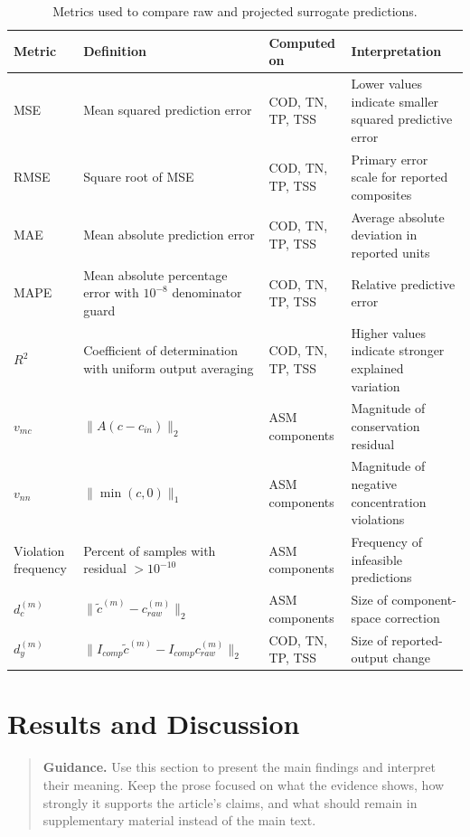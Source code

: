\documentclass[a4paper,fleqn]{cas-sc}
\newcommand{\draftguidance}[1]{%
\begin{quote}
\small
\textbf{Guidance.} #1
\end{quote}
}
\begin{document}
\begin{table}[htbp]
\centering
\caption{Metrics used to compare raw and projected surrogate predictions.}
\label{tab:evaluation_metrics}
\scriptsize
\setlength{\tabcolsep}{3pt}
\begin{tabular}{p{2.3cm}p{3.5cm}p{2.4cm}p{2.4cm}}
\hline
Metric & Definition & Computed on & Interpretation \\
\hline
MSE & Mean squared prediction error & COD, TN, TP, TSS & Lower values indicate smaller squared predictive error \\
RMSE & Square root of MSE & COD, TN, TP, TSS & Primary error scale for reported composites \\
MAE & Mean absolute prediction error & COD, TN, TP, TSS & Average absolute deviation in reported units \\
MAPE & Mean absolute percentage error with $10^{-8}$ denominator guard & COD, TN, TP, TSS & Relative predictive error \\
$R^2$ & Coefficient of determination with uniform output averaging & COD, TN, TP, TSS & Higher values indicate stronger explained variation \\
$v_{mc}$ & $\|A(c-c_{in})\|_2$ & ASM components & Magnitude of conservation residual \\
$v_{nn}$ & $\|\min(c,0)\|_1$ & ASM components & Magnitude of negative concentration violations \\
Violation frequency & Percent of samples with residual $>10^{-10}$ & ASM components & Frequency of infeasible predictions \\
$d_c^{(m)}$ & $\|\tilde{c}^{(m)}-c_{raw}^{(m)}\|_2$ & ASM components & Size of component-space correction \\
$d_y^{(m)}$ & $\|I_{comp}\tilde{c}^{(m)}-I_{comp}c_{raw}^{(m)}\|_2$ & COD, TN, TP, TSS & Size of reported-output change \\
\hline
\end{tabular}
\end{table}

\section{Results and Discussion}

\draftguidance{Use this section to present the main findings and interpret their meaning. Keep the prose focused on what the evidence shows, how strongly it supports the article's claims, and what should remain in supplementary material instead of the main text.}
\end{document}
